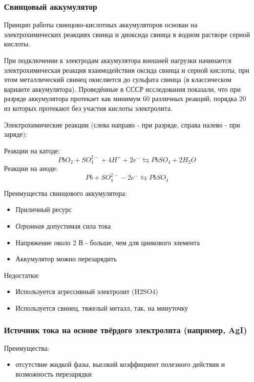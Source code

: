 \documentclass[14pt,a4paper]{scrartcl}
\begin{document}
\subsubsection*{Свинцовый аккумулятор}
Принцип работы свинцово-кислотных аккумуляторов основан на электрохимических реакциях свинца и диоксида свинца в водном растворе серной кислоты.

При подключении к электродам аккумулятора внешней нагрузки начинается электрохимическая реакция взаимодействия оксида свинца и серной кислоты, при этом металлический свинец окисляется до сульфата свинца (в классическом варианте аккумулятора). Проведённые в СССР исследования показали, что при разряде аккумулятора протекает как минимум 60 различных реакций, порядка 20 из которых протекают без участия кислоты электролита.

Электрохимические реакции (слева направо - при разряде, справа налево - при заряде):

Реакции на катоде:
$$PbO_{2}+SO_{4}^{2-}+4H^{+}+2e^{-}\leftrightarrows PbSO_{4}+2H_{2}O$$
Реакции на аноде:
$$Pb+SO_{4}^{2-}-2e^{-}\leftrightarrows PbSO_{4}$$

Преимущества свинцового аккумулятора:
\begin{itemize}
 \item Приличный ресурс
 \item \emph{Огромная} допустимая сила тока
 \item Напряжение около 2 В - больше, чем для цинкового элемента
 \item Аккумулятор можно перезарядить
 \end{itemize}
 
 Недостатки:
 \begin{itemize}
 \item Используется агрессивный электролит (H2SO4)
 \item Используется свинец, тяжелый металл, так, на минуточку
\end{itemize}

\subsubsection*{Источник тока на основе твёрдого электролита (например, AgI)} 

Преимущества:
 \begin{itemize}
 \item отсутствие жидкой фазы, высокий коэффициент полезного действия и возможность перезарядки\end{itemize}
 
\end{document}
